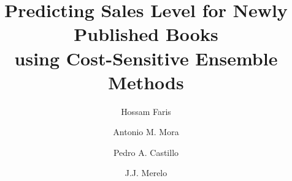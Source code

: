 \documentclass[a4paper,10pt,onecolumn,preprint,3p]{elsarticle}
\begin{document}
\begin{frontmatter}

\title{Predicting Sales Level for Newly Published Books \\
using Cost-Sensitive Ensemble Methods}


\author[abd]{Hossam Faris}
\author[ugrtstc]{Antonio M. Mora}
\author[ugratc]{Pedro A. Castillo}
\author[ugratc]{J.J. Merelo}


\address[abd]{Business Information Technology Department, King Abdullah II School for Information Technology \\
The University of Jordan, Amman, Jordan}
\address[ugrtstc]{Department of Signal Theory, Telematics and Communications, ETSIIT and CITIC \\
University of Granada, Granada, Spain}
\address[ugratc]{Department of Computer Architecture and Computer Technology, ETSIIT and CITIC \\
University of Granada, Granada, Spain}



\end{frontmatter}
\end{document}
